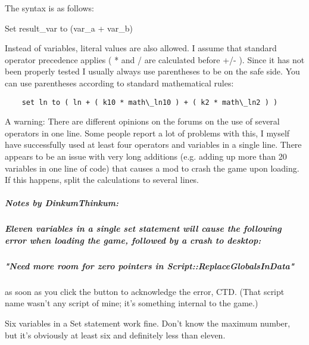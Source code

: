 The syntax is as follows:

Set result\_var to (var\_a + var\_b)

Instead of variables, literal values are also allowed. I assume that
standard operator precedence applies ( * and / are calculated before +/-
). Since it has not been properly tested I usually always use
parentheses to be on the safe side. You can use parentheses according to
standard mathematical rules:

\begin{lstlisting}
	set ln to ( ln + ( k10 * math\_ln10 ) + ( k2 * math\_ln2 ) )
\end{lstlisting}

A warning: There are different opinions on the forums on the use of
several operators in one line. Some people report a lot of problems with
this, I myself have successfully used at least four operators and
variables in a single line. There appears to be an issue with very long
additions (e.g. adding up more than 20 variables in one line of code)
that causes a mod to crash the game upon loading. If this happens, split
the calculations to several lines.

\hypertarget{notes-by-dinkumthinkum}{%
\subparagraph{Notes by DinkumThinkum:}\label{notes-by-dinkumthinkum}}

\hypertarget{eleven-variables-in-a-single-set-statement-will-cause-the-following-error-when-loading-the-game-followed-by-a-crash-to-desktop}{%
\subparagraph{\texorpdfstring{\emph{Eleven variables in a single set
statement will cause the following error when loading the game, followed
by a crash to
desktop:}}{Eleven variables in a single set statement will cause the following error when loading the game, followed by a crash to desktop:}}\label{eleven-variables-in-a-single-set-statement-will-cause-the-following-error-when-loading-the-game-followed-by-a-crash-to-desktop}}

\hypertarget{need-more-room-for-zero-pointers-in-scriptreplaceglobalsindata}{%
\subparagraph{"Need more room for zero pointers in
Script::ReplaceGlobalsInData"}\label{need-more-room-for-zero-pointers-in-scriptreplaceglobalsindata}}

as soon as you click the button to acknowledge the error, CTD. (That
script name wasn't any script of mine; it's something internal to the
game.)

Six variables in a Set statement work fine. Don't know the maximum
number, but it's obviously at least six and definitely less than eleven.

